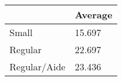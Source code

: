 \begin{table}[htbp]
\begin{tabular}{ll} \hline \hline
 & Average  \\  \hline 
Small & 15.697 \\  
Regular & 22.697 \\  
Regular/Aide & 23.436 \\  
\hline \hline \end{tabular}
\end{table}
